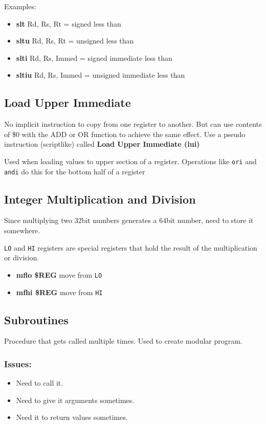 \documentclass{article}
\begin{document}
	Examples:
	\begin{itemize}
		\item \textbf{slt} Rd, Rs, Rt = signed less than
		\item \textbf{sltu} Rd, Rs, Rt = unsigned less than
		\item \textbf{slti} Rd, Rs, Immed  = signed immediate less than
		\item \textbf{sltiu} Rd, Rs, Immed  = unsigned immediate less than
	\end{itemize}

	\subsection*{Load Upper Immediate}
		No implicit instruction to copy from one register to another. But can use contents of \$0 with the ADD or OR function to achieve the same effect. Use a pseudo instruction (scriptlike) called \textbf{Load Upper Immediate (lui)}

		Used when loading values to upper section of a register. Operations like \texttt{ori} and \texttt{andi} do this for the bottom half of a register

	\subsection*{Integer Multiplication and Division}
		Since multiplying two 32bit numbers generates a 64bit number, need to store it somewhere.

		\texttt{LO} and \texttt{HI} registers are special registers that hold the result of the multiplication or division.

		\begin{itemize}
			\item \textbf{mflo \$REG} move from \texttt{LO}
			\item \textbf{mfhi \$REG} move from \texttt{HI}
		\end{itemize}

	\subsection*{Subroutines}
		Procedure that gets called multiple times. Used to create modular program.
		\subsubsection*{Issues:}
		\begin{itemize}
			\item Need to call it.
			\item Need to give it arguments sometimes.
			\item Need it to return values sometimes.
		\end{itemize}
\end{document}
